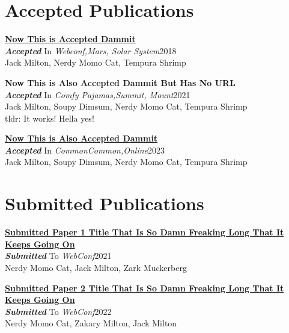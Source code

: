 \section{Accepted Publications}
\vspace{-.1275in}
\begin{flushleft}
\begin{bibsection}

\item[] \href{www.webconf.com/paperid2223}{\textbf{Now This is Accepted Dammit}} \\
\textit{\textbf{Accepted}} In \textit{Webconf,Mars, Solar System}\hfill{2018} \\
Jack Milton, Nerdy Momo Cat, Tempura Shrimp\\
\item[] {\textbf{Now This is Also Accepted Dammit But Has No URL}} \\
\textit{\textbf{Accepted}} In \textit{Comfy Pajamas,Summit, Mount}\hfill{2021} \\
Jack Milton, Soupy Dimsum, Nerdy Momo Cat, Tempura Shrimp\\tldr: It works! Hella yes!
\item[] \href{www.common.com/paper22}{\textbf{Now This is Also Accepted Dammit}} \\
\textit{\textbf{Accepted}} In \textit{CommonCommon,Online}\hfill{2023} \\
Jack Milton, Soupy Dimsum, Nerdy Momo Cat, Tempura Shrimp\\

\end{bibsection}
\end{flushleft}

\section{Submitted Publications}
\vspace{-.1275in}
\begin{flushleft}
\begin{bibsection}

\item[] \href{www.arxiv.com/subpapertitlefreaking}{\textbf{Submitted Paper 1 Title That Is So Damn Freaking Long That It Keeps Going On}} \\
\textit{\textbf{Submitted}} To \textit{WebConf}\hfill{2021} \\
Nerdy Momo Cat, Jack Milton, Zark Muckerberg\\
\item[] \href{www.arxiv.com/sub2freakinglong}{\textbf{Submitted Paper 2 Title That Is So Damn Freaking Long That It Keeps Going On}} \\
\textit{\textbf{Submitted}} To \textit{WebConf}\hfill{2022} \\
Nerdy Momo Cat, Zakary Milton, Jack Milton\\

\end{bibsection}
\end{flushleft}

